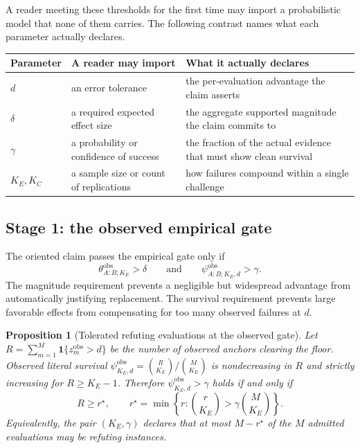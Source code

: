 \documentclass[11pt]{article}
\newtheorem{proposition}{Proposition}
\theoremstyle{remark}
\begin{document}
A reader meeting these thresholds for the first time may import a probabilistic
model that none of them carries. The following contrast names what each
parameter actually declares.
\begin{center}
\begin{tabularx}{0.96\textwidth}{@{}l>{\raggedright\arraybackslash}X>{\raggedright\arraybackslash}X@{}}
\toprule
Parameter & A reader may import & What it actually declares \\
\midrule
$d$ & an error tolerance & the per-evaluation advantage the claim asserts \\
$\delta$ & a required expected effect size & the aggregate supported magnitude the claim commits to \\
$\gamma$ & a probability or confidence of success & the fraction of the actual evidence that must show clean survival \\
$K_E,K_C$ & a sample size or count of replications & how failures compound within a single challenge \\
\bottomrule
\end{tabularx}
\end{center}

\subsection{Stage 1: the observed empirical gate}

The oriented claim passes the empirical gate only if
\begin{equation}
\theta^{\mathrm{obs}}_{A:B;K_E}>\delta
\qquad\text{and}\qquad
\psi^{\mathrm{obs}}_{A:B;K_E,d}>\gamma.
\label{eq:observed-gate}
\end{equation}
The magnitude requirement prevents a negligible but widespread advantage from
automatically justifying replacement. The survival requirement prevents large
favorable effects from compensating for too many observed failures at $d$.

\begin{proposition}[Tolerated refuting evaluations at the observed gate]
\label{prop:count}
Let $R=\sum_{m=1}^M\mathbf 1\{z_m^{\mathrm{obs}}>d\}$ be the number of observed
anchors clearing the floor. Observed literal survival
$\psi^{\mathrm{obs}}_{K_E,d}=\binom{R}{K_E}/\binom{M}{K_E}$ is nondecreasing
in $R$ and strictly increasing for $R\geq K_E-1$. Therefore
$\psi^{\mathrm{obs}}_{K_E,d}>\gamma$ holds if and only if
\[
R\geq r^\star,
\qquad
r^\star=\min\left\{r:\binom{r}{K_E}>\gamma\binom{M}{K_E}\right\}.
\]
Equivalently, the pair $(K_E,\gamma)$ declares that at most $M-r^\star$ of the
$M$ admitted evaluations may be refuting instances.
\end{proposition}
\end{document}
